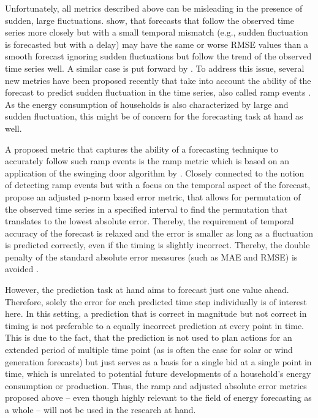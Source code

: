 Unfortunately, all metrics described above can be misleading in the presence of sudden, large fluctuations. \citet{Vallance:2017} show, that forecasts that follow the observed time series more closely but with a small temporal mismatch (e.g., sudden fluctuation is forecasted but with a delay) may have the same or worse RMSE values than a smooth forecast ignoring sudden fluctuations but follow the trend of the observed time series well. A similar case is put forward by \citet{Haben:2014}. To address this issue, several new metrics have been proposed recently that take into account the ability of the forecast to predict sudden fluctuation in the time series, also called ramp events \citep{Zhang:2015}. As the energy consumption of households is also characterized by large and sudden fluctuation, this might be of concern for the forecasting task at hand as well.

A proposed metric that captures the ability of a forecasting technique to accurately follow such ramp events is the ramp metric \citep{Vallance:2017} which is based on an application of the swinging door algorithm by \citet{Florita:2013}. Closely connected to the notion of detecting ramp events but with a focus on the temporal aspect of the forecast, \citet{Haben:2014} propose an adjusted p-norm based error metric, that allows for permutation of the observed time series in a specified interval to find the permutation that translates to the lowest absolute error. Thereby, the requirement of temporal accuracy of the forecast is relaxed and the error is smaller as long as a fluctuation is predicted correctly, even if the timing is slightly incorrect. Thereby, the double penalty of the standard absolute error measures (such as MAE and RMSE) is avoided \citep{Haben:2014}.

However, the prediction task at hand aims to forecast just one value ahead. Therefore, solely the error for each predicted time step individually is of interest here. In this setting, a prediction that is correct in magnitude but not correct in timing is not preferable to a equally incorrect prediction at every point in time. This is due to the fact, that the prediction is not used to plan actions for an extended period of multiple time point (as is often the case for solar or wind generation forecasts) but just serves as a basis for a single bid at a single point in time, which is unrelated to potential future developments of a household's energy consumption or production. Thus, the ramp and adjusted absolute error metrics proposed above -- even though highly relevant to the field of energy forecasting as a whole -- will not be used in the research at hand.

